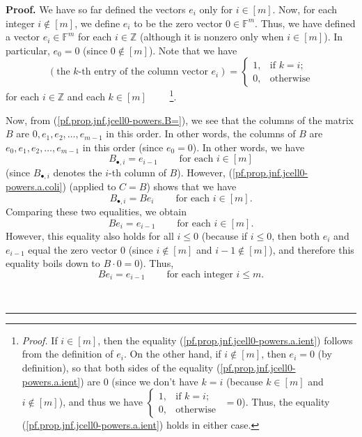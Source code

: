 \documentclass[numbers=enddot,12pt,final,onecolumn,notitlepage]{scrartcl}%
\numberwithin{exer}{subsection}
\theoremstyle{definition}
\newenvironment{proof}[1][Proof]{\noindent\textbf{#1.} }{\ \rule{0.5em}{0.5em}}
\begin{document}
\begin{proof}
We have so far defined the vectors $e_{i}$ only for $i\in\left[  m\right]  $.
Now, for each integer $i\notin\left[  m\right]  $, we define $e_{i}$ to be the
zero vector $0\in\mathbb{F}^{m}$. Thus, we have defined a vector $e_{i}%
\in\mathbb{F}^{m}$ for each $i\in\mathbb{Z}$ (although it is nonzero only when
$i\in\left[  m\right]  $). In particular, $e_{0}=0$ (since $0\notin\left[
m\right]  $). Note that we have%
\begin{equation}
\left(  \text{the }k\text{-th entry of the column vector }e_{i}\right)  =%
\begin{cases}
1, & \text{if }k=i;\\
0, & \text{otherwise}%
\end{cases}
\label{pf.prop.jnf.jcell0-powers.a.ient}%
\end{equation}
for each $i\in\mathbb{Z}$ and each $k\in\left[  m\right]  $%
\ \ \ \ \footnote{\textit{Proof.} If $i\in\left[  m\right]  $, then the
equality (\ref{pf.prop.jnf.jcell0-powers.a.ient}) follows from the definition
of $e_{i}$. On the other hand, if $i\notin\left[  m\right]  $, then $e_{i}=0$
(by definition), so that both sides of the equality
(\ref{pf.prop.jnf.jcell0-powers.a.ient}) are $0$ (since we don't have $k=i$
(because $k\in\left[  m\right]  $ and $i\notin\left[  m\right]  $), and thus
we have $%
\begin{cases}
1, & \text{if }k=i;\\
0, & \text{otherwise}%
\end{cases}
\ \ =0$). Thus, the equality (\ref{pf.prop.jnf.jcell0-powers.a.ient}) holds in
either case.}.

Now, from (\ref{pf.prop.jnf.jcell0-powers.B=}), we see that the columns of the
matrix $B$ are $0,e_{1},e_{2},\ldots,e_{m-1}$ in this order. In other words,
the columns of $B$ are $e_{0},e_{1},e_{2},\ldots,e_{m-1}$ in this order (since
$e_{0}=0$). In other words, we have%
\[
B_{\bullet,i}=e_{i-1}\ \ \ \ \ \ \ \ \ \ \text{for each }i\in\left[  m\right]
\]
(since $B_{\bullet,i}$ denotes the $i$-th column of $B$). However,
(\ref{pf.prop.jnf.jcell0-powers.a.coli}) (applied to $C=B$) shows that we have%
\[
B_{\bullet,i}=Be_{i}\ \ \ \ \ \ \ \ \ \ \text{for each }i\in\left[  m\right]
.
\]
Comparing these two equalities, we obtain%
\begin{equation}
Be_{i}=e_{i-1}\ \ \ \ \ \ \ \ \ \ \text{for each }i\in\left[  m\right]  .
\label{pf.prop.jnf.jcell0-powers.a.Bei}%
\end{equation}
However, this equality also holds for all $i\leq0$ (because if $i\leq0$, then
both $e_{i}$ and $e_{i-1}$ equal the zero vector $0$ (since $i\notin\left[
m\right]  $ and $i-1\notin\left[  m\right]  $), and therefore this equality
boils down to $B\cdot0=0$). Thus,
\begin{equation}
Be_{i}=e_{i-1}\ \ \ \ \ \ \ \ \ \ \text{for each integer }i\leq m.
\label{pf.prop.jnf.jcell0-powers.a.Bei2}%
\end{equation}



\end{proof}
\end{document}
